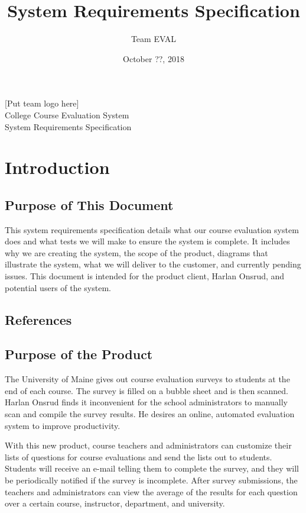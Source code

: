\documentclass{article}
\title{System Requirements Specification}
\author{Team EVAL}
\date{October ??, 2018}
\begin{document}
\maketitle

\newpage

\begin{center}
[Put team logo here]\\ \bigskip
{\LARGE College Course Evaluation System }\\ \medskip
{\large System Requirements Specification }\\
\end{center}

\tableofcontents

\newpage

\section{Introduction}
\subsection{Purpose of This Document}

This system requirements specification details what our course evaluation system does and what tests we will make to ensure the system is complete. It includes why we are creating the system, the scope of the product, diagrams that illustrate the system, what we will deliver to the customer, and currently pending issues. This document is intended for the product client, Harlan Onsrud, and potential users of the system.

\subsection{References}
\subsection{Purpose of the Product}

The University of Maine gives out course evaluation surveys to students at the end of each course. The survey is filled on a bubble sheet and is then scanned. Harlan Onsrud finds it inconvenient for the school administrators to manually scan and compile the survey results. He desires an online, automated evaluation system to improve productivity.\par

With this new product, course teachers and administrators can customize their lists of questions for course evaluations and send the lists out to students. Students will receive an e-mail telling them to complete the survey, and they will be periodically notified if the survey is incomplete. After survey submissions, the teachers and administrators can view the average of the results for each question over a certain course, instructor, department, and university.
\end{document}
